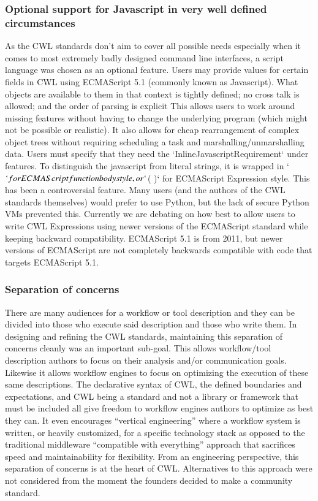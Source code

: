 \subsubsection{Optional support for Javascript in very well defined circumstances}
As the CWL standards don’t aim to cover all possible needs especially when it comes to most extremely badly designed command line interfaces, a script language was chosen as an optional feature.
Users may provide values for certain fields in CWL using ECMAScript 5.1 (commonly known as Javascript). What objects are available to them in that context is tightly defined; no cross talk is allowed; and the order of parsing is explicit
This allows users to work around missing features without having to change the underlying program (which might not be possible or realistic). It also allows for cheap rearrangement of complex object trees without requiring scheduling a task and marshalling/unmarshalling data.
Users must specify that they need the `InlineJavascriptRequirement` under features. To distinguish the javascript from literal strings, it is wrapped in `${ }` for  ECMAScript function body style, or `$( )` for ECMAScript Expression style.
This has been a controversial feature. Many users (and the authors of the CWL standards themselves) would prefer to use Python, but the lack of secure Python VMs prevented this. Currently we are debating on how best to allow users to write CWL Expressions using newer versions of the ECMAScript standard while keeping backward compatibility. ECMAScript 5.1 is from 2011, but newer versions of ECMAScript are not completely backwards compatible with code that targets ECMAScript 5.1.
\subsubsection{Separation of concerns}
There are many audiences for a workflow or tool description and they can be divided into those who execute said description and those who write them.
In designing and refining the CWL standards, maintaining this separation of concerns cleanly was an important sub-goal.
This allows workflow/tool description authors to focus on their analysis and/or communication goals. Likewise it allows workflow engines to focus on optimizing the execution of these same descriptions.
The declarative syntax of CWL, the defined boundaries and expectations, and CWL being a standard and not a library or framework that must be included all give freedom to workflow engines authors to optimize as best they can. It even encourages “vertical engineering” where a workflow system is written, or heavily customized, for a specific technology stack as opposed to the traditional middleware “compatible with everything” approach that sacrifices speed and maintainability for flexibility.
From an engineering perspective, this separation of concerns is at the heart of CWL. Alternatives to this approach were not considered from the moment the founders decided to make a community standard.
